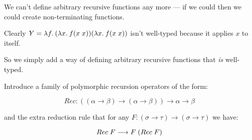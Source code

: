 \begin{slide*}


\vspace*{0.5cm}

We can't define arbitrary recursive functions any more --- if we could then we
could create non-terminating functions.

Clearly {\red $Y = \lambda f.\: (\lambda x.\: f(x\; x)) (\lambda x.\: f(x\; x))$} isn't
well-typed because it applies {\red $x$} to itself.

So we simply add a way of defining arbitrary recursive functions that {\em is}
well-typed.

Introduce a family of polymorphic recursion operators of the form:

{\red $$ Rec : ((\alpha \to \beta) \to (\alpha \to \beta)) \to \alpha \to \beta
$$}

and the extra reduction rule that for any {\red $F:(\sigma \to \tau) \to
(\sigma \to \tau)$} we have:

{\red $$ Rec\; F \longrightarrow F\; (Rec\;  F) $$}

\end{slide*}



